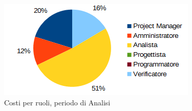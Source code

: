 	\begin{figure}[H]
		\centering
		\includegraphics[width=1\linewidth]{immagini/grafici/analisi-torta-costo.png}
		\caption{Costi per ruoli, periodo di Analisi}
	\end{figure}
